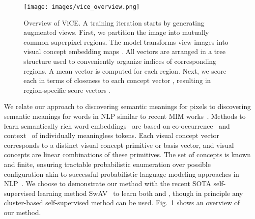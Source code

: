 \documentclass{bmvc2k}
\begin{document}
\begin{figure}
\begin{center}
\texttt{[image: images/vice\_overview.png]}
\end{center}
   \caption{Overview of ViCE. A training iteration starts by generating  augmented views. First, we partition the image into  mutually common superpixel regions. The model  transforms view images into visual concept embedding maps . All vectors  are arranged in a tree structure  used to conveniently organize indices of corresponding regions. A mean vector  is computed for each region. Next, we score each  in terms of closeness to each concept vector , resulting in region-specific score vectors .}
\label{fig:overview}
\end{figure}
We relate our approach to discovering semantic meanings for pixels to discovering semantic meanings for words in NLP similar to recent MIM works~\cite{Bao2022BEiT, Zhou2021iBOT, Chen2022CAE, Xie2021SimMIMAS}. Methods to learn semantically rich word embeddings~\cite{Mikolov2013EffWordRep,Mikolov2013DistributedRO,Pennington2014GloVe} are based on
co-occurrence~\cite{Harris1954DistributionalHypothesis} and context~\cite{Devlin2019BERT,Peters2018ELMO} of individually meaningless tokens. Each visual concept vector  corresponds to a distinct visual concept primitive or basis vector, and visual concepts are linear combinations of these primitives. The set of concepts  is known and finite, ensuring tractable probabilistic enumeration over possible configuration akin to successful probabilistic language modeling approaches in NLP~\cite{Devlin2019BERT, Radford2018GPT}. We choose to demonstrate our method with the recent SOTA self-supervised learning method SwAV~\cite{Caron2020SwAV} to learn both  and , though in principle any cluster-based self-supervised method can be used. Fig.~\ref{fig:overview} shows an overview of our method.
\end{document}
